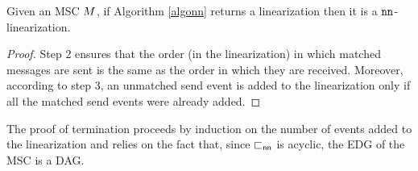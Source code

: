 \begin{proposition}
	Given an MSC $M$, if Algorithm \ref{algonn} returns a linearization then  it is a $\mathtt{nn}$-linearization.
\end{proposition}
\begin{proof}
	Step 2 ensures that the order (in the linearization) in which matched messages are sent is the same as the order in which they are received. Moreover, according to step 3, an unmatched send event is added to the linearization only if all the matched send events were already added.
\end{proof}

The proof of termination proceeds by induction on the number of events added to the linearization and relies on the fact that, since $\sqsubset_{\mathsf{nn}}$ is acyclic, the EDG of the MSC is a DAG.

